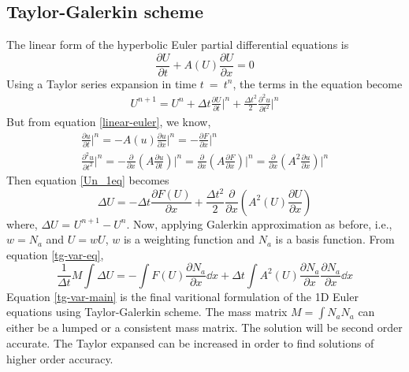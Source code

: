 \documentclass[12pt, oneside]{article}
\begin{document}
\subsection{Taylor-Galerkin scheme}
The linear form of the hyperbolic Euler partial differential equations is
\begin{equation}
    \frac {\partial U} { \partial t} + A(U)\frac {\partial U} { \partial x} = 0
    \label{linear-euler}
\end{equation}
Using a Taylor series expansion in time $t\ =\ t^n$, the terms in the equation become
\begin{equation}
\begin{aligned}
    U^{n+1} = U^n + \Delta t \frac {\partial U} { \partial t}\bigg|^n + \frac{\Delta t^2}{2} \frac {\partial^2 u} { \partial t^2}\bigg|^n 
    \label{Un_1eq}
\end{aligned}
\end{equation}
But from equation \ref{linear-euler}, we know, 
\begin{equation}
\begin{gathered}
	\frac {\partial u} { \partial t}\bigg|^n = - A(u)\frac {\partial u} { \partial x}\bigg|^n = - \frac {\partial F} { \partial x}\bigg|^n \\
	\frac {\partial^2 u } { \partial t^2}\bigg|^n = - \frac {\partial } { \partial x} \left( A \frac {\partial u} { \partial t} \right)\bigg|^n = \frac {\partial } { \partial x} \left( A \frac {\partial F} { \partial x} \right)\bigg|^n = \frac {\partial } { \partial x} \left( A^2 \frac {\partial u} { \partial x} \right)\bigg|^n   
	\label{tg-1dudt}
\end{gathered}   
\end{equation}
Then equation \ref{Un_1eq} becomes
\begin{equation}
    \Delta U = - \Delta t \frac {\partial F(U)}{ \partial x} + \frac{\Delta t^2}{2} \frac {\partial } { \partial x} \left( A^2(U) \frac {\partial U} { \partial x} \right) 
\label{tg-var-eq}
\end{equation}
where, $\Delta U$ = $U^{n+1} - U^n$. Now, applying Galerkin approximation as before, i.e., $w = N_a$ and $U = wU$, $w$ is a weighting function and $N_a$ is a basis function. From equation \ref{tg-var-eq},
\begin{equation}
    \frac{1}{\Delta t}M \int \Delta U = - \int F(U) \frac {\partial N_a} { \partial x} \dd x + \Delta t \int A^2(U) \frac {\partial N_a} { \partial x} \frac {\partial N_a} { \partial x} \dd x  \label{tg-var-main}
\end{equation}
Equation \ref{tg-var-main} is the final varitional formulation of the 1D Euler equations using Taylor-Galerkin scheme. The mass matrix $M = \int N_a N_a $ can either be a lumped or a consistent mass matrix. The solution will be second order accurate. The Taylor expansed can be increased in order to find solutions of higher order accuracy.
\end{document}
